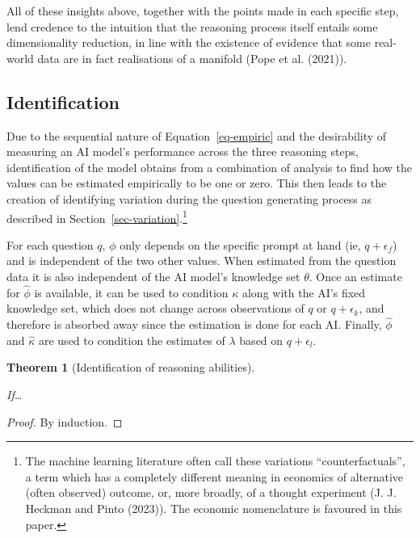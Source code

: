 \documentclass[
]{article}
\theoremstyle{plain}
\newtheorem{theorem}{Theorem}[section]
\theoremstyle{definition}
\theoremstyle{remark}
\begin{document}
All of these insights above, together with the points made in each
specific step, lend credence to the intuition that the reasoning process
itself entails some dimensionality reduction, in line with the existence
of evidence that some real-world data are in fact realisations of a
manifold (Pope et al. (2021)).

\subsection{Identification}\label{identification}

Due to the sequential nature of Equation~\ref{eq-empiric} and the
desirability of measuring an AI model's performance across the three
reasoning steps, identification of the model obtains from a combination
of analysis to find how the values can be estimated empirically to be
one or zero. This then leads to the creation of identifying variation
during the question generating process as described in
Section~\ref{sec-variation}.\footnote{The machine learning literature
  often call these variations ``counterfactuals'', a term which has a
  completely different meaning in economics of alternative (often
  observed) outcome, or, more broadly, of a thought experiment (J. J.
  Heckman and Pinto (2023)). The economic nomenclature is favoured in
  this paper.}

For each question \(q\), \(\phi\) only depends on the specific prompt at
hand (ie, \(q + \epsilon_f\)) and is independent of the two other
values. When estimated from the question data it is also independent of
the AI model's knowledge set \(\theta\). Once an estimate for
\(\hat{\phi}\) is available, it can be used to condition \(\kappa\)
along with the AI's fixed knowledge set, which does not change across
observations of \(q\) or \(q + \epsilon_k\), and therefore is absorbed
away since the estimation is done for each AI. Finally, \(\hat{\phi}\)
and \(\hat{\kappa}\) are used to condition the estimates of \(\lambda\)
based on \(q + \epsilon_l\).

\begin{theorem}[Identification of reasoning
abilities]\protect\hypertarget{thm-identification}{}\label{thm-identification}

If\ldots{}

\end{theorem}

\begin{proof}
By induction.
\end{proof}
\end{document}
